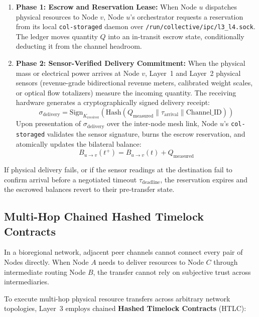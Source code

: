 \begin{enumerate}
  \item \textbf{Phase 1: Escrow and Reservation Lease:} When Node $u$ dispatches physical resources to Node $v$, Node $u$'s orchestrator requests a reservation from its local \texttt{col-storaged} daemon over \texttt{/run/collective/ipc/l3\_l4.sock}. The ledger moves quantity $Q$ into an in-transit escrow state, conditionally deducting it from the channel headroom.
  \item \textbf{Phase 2: Sensor-Verified Delivery Commitment:} When the physical mass or electrical power arrives at Node $v$, Layer~1 and Layer~2 physical sensors (revenue-grade bidirectional revenue meters, calibrated weight scales, or optical flow totalizers) measure the incoming quantity. The receiving hardware generates a cryptographically signed delivery receipt:
  \begin{equation}
  \sigma_{\mathrm{delivery}} = \mathrm{Sign}_{K_{\mathrm{receiver}}}\left( \mathrm{Hash}(Q_{\mathrm{measured}} \parallel \tau_{\mathrm{arrival}} \parallel \mathrm{Channel\_ID}) \right)
  \label{eq:ch4_delivery_receipt}
  \end{equation}
  Upon presentation of $\sigma_{\mathrm{delivery}}$ over the inter-node mesh link, Node $u$'s \texttt{col-storaged} validates the sensor signature, burns the escrow reservation, and atomically updates the bilateral balance:
  \begin{equation}
  B_{u \to v}(t^+) = B_{u \to v}(t) + Q_{\mathrm{measured}}
  \label{eq:ch4_balance_update}
  \end{equation}
\end{enumerate}

If physical delivery fails, or if the sensor readings at the destination fail to confirm arrival before a negotiated timeout $\tau_{\mathrm{deadline}}$, the reservation expires and the escrowed balances revert to their pre-transfer state.

\subsection{Multi-Hop Chained Hashed Timelock Contracts}

In a bioregional network, adjacent peer channels cannot connect every pair of Nodes directly. When Node $A$ needs to deliver resources to Node $C$ through intermediate routing Node $B$, the transfer cannot rely on subjective trust across intermediaries. 

To execute multi-hop physical resource transfers across arbitrary network topologies, Layer~3 employs chained \textbf{Hashed Timelock Contracts} (HTLC):

